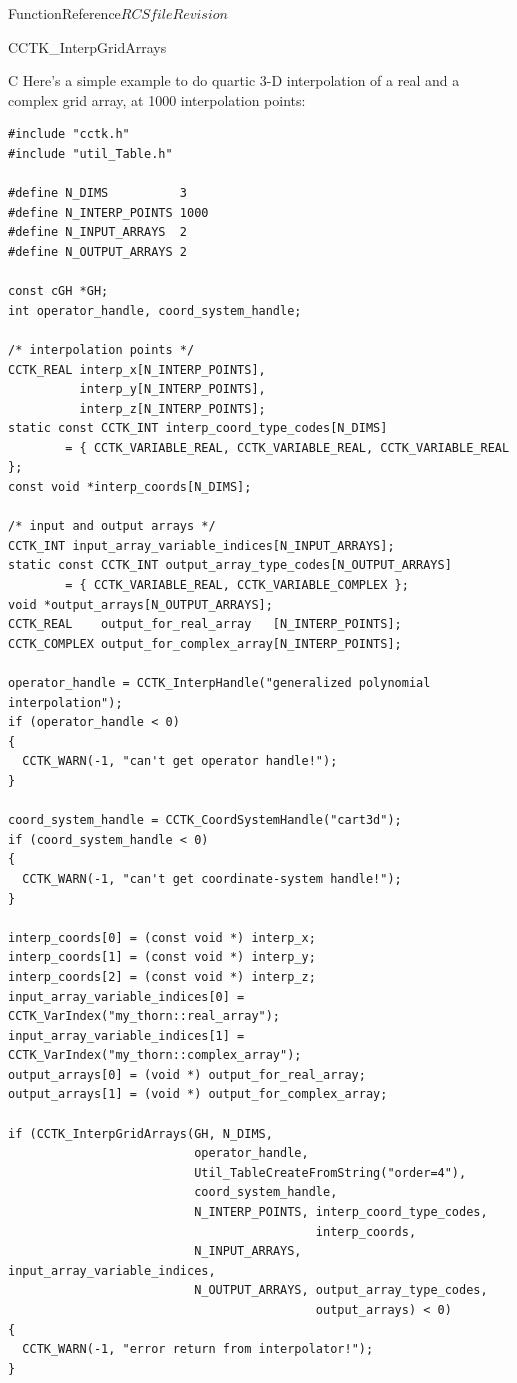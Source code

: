\begin{cactuspart}{FunctionReference}{$RCSfile$}{$Revision$}
\begin{FunctionDescription}{CCTK\_InterpGridArrays}
\begin{ExampleSection}
\begin{Example}{C}
Here's a simple example to do quartic 3-D interpolation of a real
and a complex grid array, at 1000 interpolation points:
\begin{verbatim}
#include "cctk.h"
#include "util_Table.h"

#define N_DIMS          3
#define N_INTERP_POINTS 1000
#define N_INPUT_ARRAYS  2
#define N_OUTPUT_ARRAYS 2

const cGH *GH;
int operator_handle, coord_system_handle;

/* interpolation points */
CCTK_REAL interp_x[N_INTERP_POINTS],
          interp_y[N_INTERP_POINTS],
          interp_z[N_INTERP_POINTS];
static const CCTK_INT interp_coord_type_codes[N_DIMS]
        = { CCTK_VARIABLE_REAL, CCTK_VARIABLE_REAL, CCTK_VARIABLE_REAL };
const void *interp_coords[N_DIMS];

/* input and output arrays */
CCTK_INT input_array_variable_indices[N_INPUT_ARRAYS];
static const CCTK_INT output_array_type_codes[N_OUTPUT_ARRAYS]
        = { CCTK_VARIABLE_REAL, CCTK_VARIABLE_COMPLEX };
void *output_arrays[N_OUTPUT_ARRAYS];
CCTK_REAL    output_for_real_array   [N_INTERP_POINTS];
CCTK_COMPLEX output_for_complex_array[N_INTERP_POINTS];

operator_handle = CCTK_InterpHandle("generalized polynomial interpolation");
if (operator_handle < 0)
{
  CCTK_WARN(-1, "can't get operator handle!");
}

coord_system_handle = CCTK_CoordSystemHandle("cart3d");
if (coord_system_handle < 0)
{
  CCTK_WARN(-1, "can't get coordinate-system handle!");
}

interp_coords[0] = (const void *) interp_x;
interp_coords[1] = (const void *) interp_y;
interp_coords[2] = (const void *) interp_z;
input_array_variable_indices[0] = CCTK_VarIndex("my_thorn::real_array");
input_array_variable_indices[1] = CCTK_VarIndex("my_thorn::complex_array");
output_arrays[0] = (void *) output_for_real_array;
output_arrays[1] = (void *) output_for_complex_array;

if (CCTK_InterpGridArrays(GH, N_DIMS,
                          operator_handle,
                          Util_TableCreateFromString("order=4"),
                          coord_system_handle,
                          N_INTERP_POINTS, interp_coord_type_codes,
                                           interp_coords,
                          N_INPUT_ARRAYS, input_array_variable_indices,
                          N_OUTPUT_ARRAYS, output_array_type_codes,
                                           output_arrays) < 0)
{
  CCTK_WARN(-1, "error return from interpolator!");
}
\end{verbatim}
\end{Example}
\end{ExampleSection}
\end{FunctionDescription}


\end{cactuspart}
